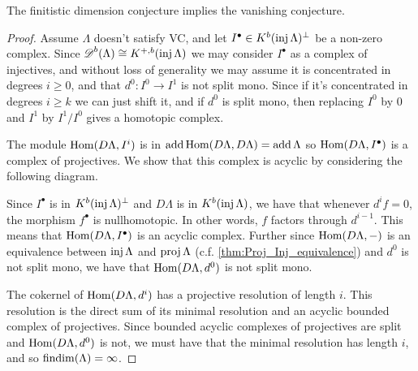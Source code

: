 \begin{theorem} \cite[1.2]{Hap93} \label{thm:FDC_implies_VC}
	The finitistic dimension conjecture implies the vanishing conjecture.
	\begin{proof}
		Assume $\Lambda$ doesn't satisfy VC, and let $I^\bullet \in K^b(\operatorname{inj}\Lambda)^\perp$ be a non-zero complex. Since $\operatorname{\mathscr{D}}^b(\Lambda) \cong K^{+,b}(\operatorname{inj}\Lambda)$ we may consider $I^\bullet$ as a complex of injectives, and without loss of generality we may assume it is concentrated in degrees $i \geq 0$, and that $d^0\colon I^0 \to I^1$ is not split mono. Since if it's concentrated in degrees $i \geq k$ we can just shift it, and if $d^0$ is split mono, then replacing $I^0$ by $0$ and $I^1$ by $I^1/I^0$ gives a homotopic complex.
			
		The module $\operatorname{Hom}(D\Lambda, I^i)$ is in $\operatorname{add}\operatorname{Hom}(D\Lambda, D\Lambda) = \operatorname{add}\Lambda$ so $\operatorname{Hom}(D\Lambda, I^\bullet)$ is a complex of projectives. We show that this complex is acyclic by considering the following diagram.
		
		\begin{center}
		\end{center}
		
		Since $I^\bullet$ is in $K^b(\operatorname{inj}\Lambda)^\perp$ and $D\Lambda$ is in $K^b(\operatorname{inj}\Lambda)$, we have that whenever $d^if=0$, the morphism $f^\bullet$ is nullhomotopic. In other words, $f$ factors through $d^{i-1}$. This means that $\operatorname{Hom}(D\Lambda, I^\bullet)$ is an acyclic complex. Further since $\operatorname{Hom}(D\Lambda, -)$ is an equivalence between $\operatorname{inj}\Lambda$ and $\operatorname{proj}\Lambda$ (c.f. \cref{thm:Proj_Inj_equivalence}) and $d^0$ is not split mono, we have that $\operatorname{Hom}(D\Lambda, d^0)$ is not split mono.
		
		The cokernel of $\operatorname{Hom}(D\Lambda, d^i)$ has a projective resolution of length $i$. This resolution is the direct sum of its minimal resolution and an acyclic bounded complex of projectives. Since bounded acyclic complexes of projectives are split and $\operatorname{Hom}(D\Lambda, d^0)$ is not, we must have that the minimal resolution has length $i$, and so $\operatorname{findim}(\Lambda) = \infty$.
	\end{proof}
\end{theorem}

